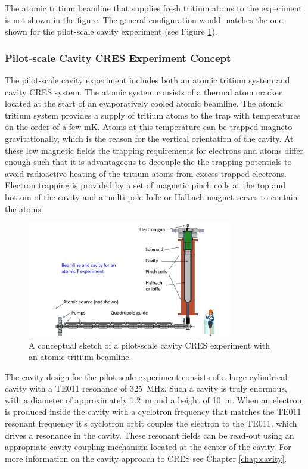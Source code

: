 The atomic tritium beamline that supplies fresh tritium atoms to the experiment is not shown in the figure. The general configuration would matches the one shown for the pilot-scale cavity experiment (see Figure \ref{fig:chap3-cavity-pilot-scale}).

\subsubsection*{Pilot-scale Cavity CRES Experiment Concept}

The pilot-scale cavity experiment includes both an atomic tritium system and cavity CRES system. The atomic system consists of a thermal atom cracker located at the start of an evaporatively cooled atomic beamline. The atomic tritium system provides a supply of tritium atoms to the trap with temperatures on the order of a few mK. Atoms at this temperature can be trapped magneto-gravitationally, which is the reason for the vertical orientation of the cavity. At these low magnetic fields the trapping requirements for electrons and atoms differ enough such that it is advantageous to decouple the the trapping potentials to avoid radioactive heating of the tritium atoms from excess trapped electrons. Electron trapping is provided by a set of magnetic pinch coils at the top and bottom of the cavity and a multi-pole Ioffe or Halbach magnet serves to contain the atoms.

\begin{figure}[htbp]
    \centering
    \includegraphics*[width=0.8\textwidth]{figs/Chapter-3/CavityAndBeamAndPerson2.pdf}
    \caption{\label{fig:chap3-cavity-pilot-scale} A conceptual sketch of a pilot-scale cavity CRES experiment with an atomic tritium beamline.}
\end{figure}

The cavity design for the pilot-scale experiment consists of a large cylindrical cavity with a TE011 resonance of 325~MHz. Such a cavity is truly enormous, with a diameter of approximately 1.2~m and a height of 10~m. When an electron is produced inside the cavity with a cyclotron frequency that matches the TE011 resonant frequency it's cyclotron orbit couples the electron to the TE011, which drives a resonance in the cavity. These resonant fields can be read-out using an appropriate cavity coupling mechanism located at the center of the cavity. For more information on the cavity approach to CRES see Chapter \ref{chap:cavity}.

